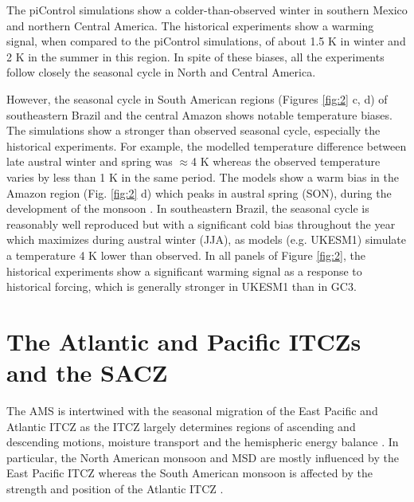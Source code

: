 The piControl simulations show a colder-than-observed winter in southern Mexico and northern Central America. The historical experiments show a warming signal, when compared to the piControl simulations, of about 1.5 K in winter and 2 K in the summer in this region. In spite of these biases, all the experiments follow closely the seasonal cycle in North and Central America.

However, the seasonal cycle in South American regions (Figures \ref{fig:2} c, d) of southeastern Brazil and the central Amazon shows notable temperature biases.
The simulations show a stronger than observed seasonal cycle, especially the historical experiments. For example, the modelled temperature difference between late austral winter and spring was $\approx$4 K whereas the observed temperature varies by less than 1 K in the same period. The models show a warm bias in the Amazon region (Fig. \ref{fig:2} d) which peaks in austral spring (SON), during the development of the monsoon \citep{marengo2012}.
In southeastern Brazil, the seasonal cycle is reasonably well reproduced but with a significant cold bias throughout the year which maximizes during austral winter (JJA), as models (e.g. UKESM1) simulate  a temperature 4 K lower than observed.
In all panels of Figure \ref{fig:2}, the historical experiments show a significant warming signal as a response to historical forcing, which is generally stronger in UKESM1 than in GC3. 

\section{The Atlantic and Pacific ITCZs and the SACZ}\label{sq:itcz}



The AMS is intertwined with the seasonal migration of the East Pacific and Atlantic ITCZ as the ITCZ largely determines regions of ascending and descending motions, moisture transport and the hemispheric energy balance \citep{oueslati2013,li2014,zhou2016,cai2019pantropical}. In particular, the North American monsoon and MSD are mostly influenced by the East Pacific ITCZ whereas the South American monsoon is affected by the strength and position of the Atlantic ITCZ \citep{yoon2010atlantic,marengo2012}. 


